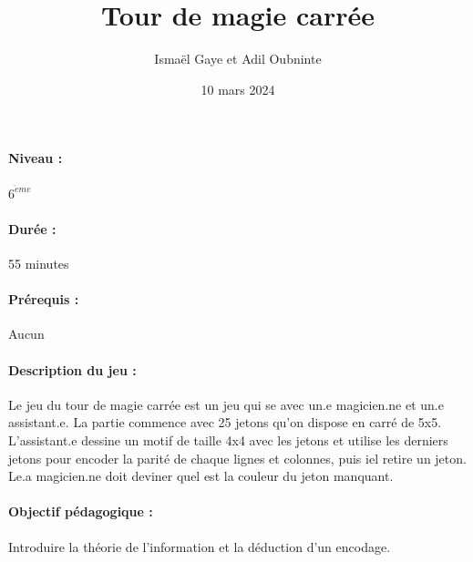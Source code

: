 \documentclass[12pt, a4paper]{article}
\begin{document}
	
	\title{Tour de magie carrée}
	\author{Ismaël Gaye et Adil Oubninte}
	\date{10 mars 2024}
	\maketitle
	
	\paragraph*{Niveau :} $6^{\grave{e}me}$
	\paragraph*{Durée :} 55 minutes
	\paragraph*{Prérequis :} Aucun
	\paragraph*{Description du jeu :}
	Le jeu du tour de magie carrée est un jeu qui se avec un.e magicien.ne et un.e assistant.e. La partie commence avec 25 jetons qu'on dispose en carré de 5x5. L'assistant.e dessine un motif de taille 4x4 avec les jetons et utilise les derniers jetons pour encoder la parité de chaque lignes et colonnes, puis iel retire un jeton. Le.a magicien.ne doit deviner quel est la couleur du jeton manquant.
	
	\paragraph*{Objectif pédagogique :}
	Introduire la théorie de l'information et la déduction d'un encodage.
	
\end{document}
